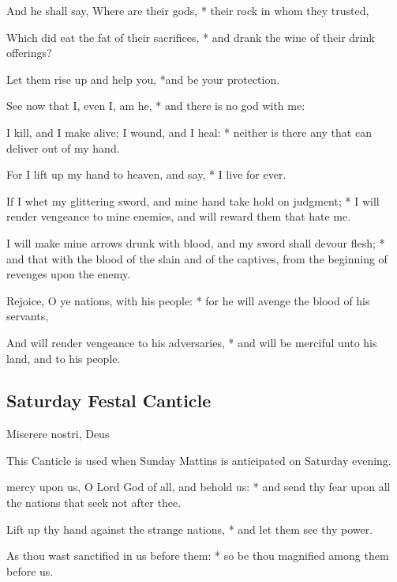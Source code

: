 \begin{multicols}{2}
And he shall say, Where are their gods, * their rock in whom they trusted,\par
Which did eat the fat of their sacrifices, * and drank the wine of their drink offerings?\par
Let them rise up and help you, *and be your protection.\par
See now that I, even I, am he, * and there is no god with me:\par
I kill, and I make alive; {\dag} I wound, and I heal: * neither is there any that can deliver out of my hand.\par
For I lift up my hand to heaven, and say, * I live for ever.\par
If I whet my glittering sword, and mine hand take hold on judgment; * I will render vengeance to mine enemies, and will reward them that hate me.\par
I will make mine arrows drunk with blood, {\dag} and my sword shall devour flesh; * and that with the blood of the slain and of the captives, from the beginning of revenges upon the enemy.\par
Rejoice, O ye nations, with his people: * for he will avenge the blood of his servants,\par
And will render vengeance to his adversaries, * and will be merciful unto his land, and to his people.

\subsection{Saturday Festal Canticle}

\begin{inhead}
Miserere nostri, Deus
\end{inhead}

\begin{rubric}
    This Canticle is used when Sunday Mattins is anticipated on Saturday evening.
\end{rubric}

 mercy upon us, O Lord God of all, and behold us: * and send thy fear upon all the nations that seek not after thee.\par
\newcolumn

Lift up thy hand against the strange nations, * and let them see thy power.


As thou wast sanctified in us before them: * so be thou magnified among them before us.


\end{multicols}
